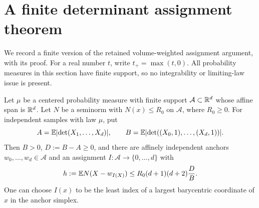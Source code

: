 \section{A finite determinant assignment theorem}
\label{sec:assignment}
We record a finite version of the retained volume-weighted assignment
argument, with its proof. For a real number $t$, write $t_+=\max(t,0)$.
All probability measures in this section have finite support, so no
integrability or limiting-law issue is present.

\begin{lemma}\label{lem:assignment}
Let $\mu$ be a centered probability measure with finite support
$\mathcal A\subset\mathbb R^d$ whose affine span is $\mathbb R^d$. Let $N$ be a seminorm
with $N(x)\le R_0$ on $\mathcal A$, where $R_0\ge0$. For independent
samples with law $\mu$, put
\[
 A=\mathbb E\lvert \det(X_1,\ldots,X_d)\rvert,\qquad
 B=\mathbb E\lvert \det((X_0,1),\ldots,(X_d,1))\rvert.
\]
Then $B>0$, $D:=B-A\ge0$, and there are affinely independent anchors
$w_0,\ldots,w_d\in\mathcal A$ and an assignment $I:\mathcal A\to\{0,\ldots,d\}$
with
\begin{equation}\label{eq:assignment}
 h:=\mathbb E N(X-w_{I(X)})\le R_0(d+1)(d+2)\frac{D}{B}.
\end{equation}
One can choose $I(x)$ to be the least index of a largest barycentric
coordinate of $x$ in the anchor simplex.
\end{lemma}
